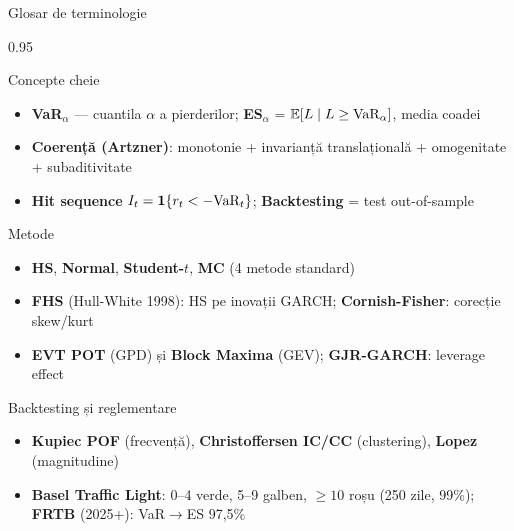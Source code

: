 \documentclass[9pt, aspectratio=169, t]{beamer}
\begin{document}
\begin{frame}[shrink=10]{Glosar de terminologie}
\begin{cminipage}{0.95\textwidth}
\begin{block}{Concepte cheie}
\begin{itemize}\setlength{\itemsep}{0pt}
    \item \textbf{VaR$_\alpha$} --- cuantila $\alpha$ a pierderilor; \textbf{ES$_\alpha$} = $\mathbb{E}[L \mid L \geq \text{VaR}_\alpha]$, media coadei
    \item \textbf{Coerență (Artzner)}: monotonie + invarianță translațională + omogenitate + subaditivitate
    \item \textbf{Hit sequence} $I_t = \mathbf{1}\{r_t < -\text{VaR}_t\}$; \textbf{Backtesting} = test out-of-sample
\end{itemize}
\end{block}
\begin{block}{Metode}
\begin{itemize}\setlength{\itemsep}{0pt}
    \item \textbf{HS}, \textbf{Normal}, \textbf{Student-$t$}, \textbf{MC} (4 metode standard)
    \item \textbf{FHS} (Hull-White 1998): HS pe inovații GARCH; \textbf{Cornish-Fisher}: corecție skew/kurt
    \item \textbf{EVT POT} (GPD) și \textbf{Block Maxima} (GEV); \textbf{GJR-GARCH}: leverage effect
\end{itemize}
\end{block}
\begin{block}{Backtesting și reglementare}
\begin{itemize}\setlength{\itemsep}{0pt}
    \item \textbf{Kupiec POF} (frecvență), \textbf{Christoffersen IC/CC} (clustering), \textbf{Lopez} (magnitudine)
    \item \textbf{Basel Traffic Light}: 0--4 verde, 5--9 galben, $\geq 10$ roșu (250 zile, 99\%); \textbf{FRTB} (2025+): VaR$\to$ES 97{,}5\%
\end{itemize}
\end{block}
\end{cminipage}
\end{frame}
\end{document}
